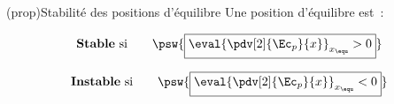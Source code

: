 \documentclass[../../main/main.tex]{subfiles}
\begin{document}
\begin{tcb*}(prop){Stabilité des positions d'équilibre}
	Une position d'équilibre est~:\\
	\begin{isd}
		\[\text{\textbf{Stable} si}
			\qquad
			\psw{\boxed{\eval{\pdv[2]{\Ec_p}{x}}_{x_{\equ}} > 0}}
		\]
		\begin{center}
			\vspace{-15pt}
		\end{center}
		\tcblower
		\[\text{\textbf{Instable} si}
			\qquad
			\psw{\boxed{\eval{\pdv[2]{\Ec_p}{x}}_{x_{\equ}} < 0}}
		\]
		\begin{center}
			\vspace{-15pt}
		\end{center}
	\end{isd}
\end{tcb*}
\end{document}
